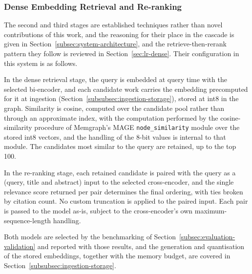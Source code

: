 \subsubsection{Dense Embedding Retrieval and Re-ranking}
\label{subsubsec:dense-rerank}

The second and third stages are established techniques rather than novel contributions of this work, and the reasoning for their place in the cascade is given in Section~\ref{subsec:system-architecture}, and the retrieve-then-rerank pattern they follow is reviewed in Section~\ref{sec:lr-dense}. Their configuration in this system is as follows.

In the dense retrieval stage, the query is embedded at query time with the selected bi-encoder, and each candidate work carries the embedding precomputed for it at ingestion (Section~\ref{subsubsec:ingestion-storage}), stored at int8 in the graph. Similarity is cosine, computed over the candidate pool rather than through an approximate index, with the computation performed by the cosine-similarity procedure of Memgraph's MAGE \texttt{node\_similarity} module over the stored int8 vectors, and the handling of the 8-bit values is internal to that module.
The candidates most similar to the query are retained, up to the top 100.

In the re-ranking stage, each retained candidate is paired with the query as a (query, title and abstract) input to the selected cross-encoder, and the single relevance score returned per pair determines the final ordering, with ties broken by citation count. No custom truncation is applied to the paired input. Each pair is passed to the model as-is, subject to the cross-encoder's own maximum-sequence-length handling.

Both models are selected by the benchmarking of Section~\ref{subsec:evaluation-validation} and reported with those results, and the generation and quantisation of the stored embeddings, together with the memory budget, are covered in Section~\ref{subsubsec:ingestion-storage}.

